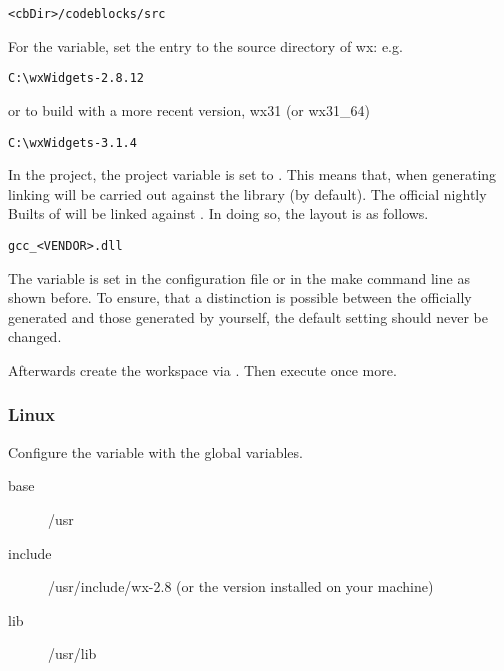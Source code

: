 \begin{verbatim}
<cbDir>/codeblocks/src
\end{verbatim}


For the  variable, set the  entry to the source directory of wx: e.g.

\begin{verbatim}
C:\wxWidgets-2.8.12
\end{verbatim}

or to build with a more recent version, wx31 (or wx31\_64)

\begin{verbatim}
C:\wxWidgets-3.1.4
\end{verbatim}

In the \codeblocks project, the project variable  is set to . This means that, when generating \codeblocks linking will be carried out against the  library (by default). The official nightly Builts of \codeblocks will be linked against . In doing so, the layout is as follows.

\begin{verbatim}
gcc_<VENDOR>.dll
\end{verbatim}

The  variable is set in the configuration file  or in the make command line as shown before. To ensure, that a distinction is possible between the officially generated \codeblocks and those generated by yourself, the default setting  should never be changed.

Afterwards create the workspace  via . Then execute  once more.

\subsubsection{Linux}

Configure the  variable with the global variables.

\begin{description}
\item[base] /usr
\item[include] /usr/include/wx-2.8 (or the version installed on your machine)
\item[lib] /usr/lib
\end{description}


